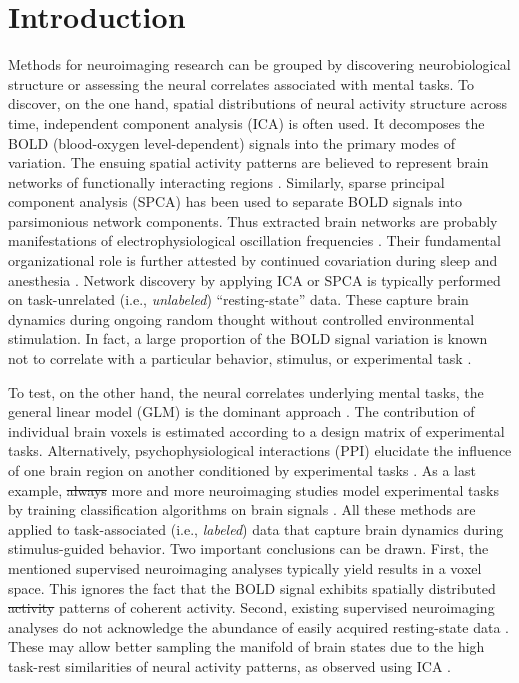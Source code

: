 \documentclass{article} %
\newcommand{\suggestadd}[1]{{\color{blue} #1}}
\newcommand{\suggestremove}[1]{{\color{red} \sout{#1}}}
\begin{document}
\section{Introduction}
%
Methods for neuroimaging research can be grouped by discovering
neurobiological structure or assessing the neural correlates associated
with mental tasks.
To discover, on the one hand, spatial distributions of neural activity
structure across time,
independent component analysis (ICA) \cite{beckmann2005} is often used.
It decomposes the BOLD (blood-oxygen level-dependent) signals into the
primary modes of variation.
The ensuing spatial activity patterns are believed to represent
brain networks of
functionally interacting regions \cite{smith2009}.
Similarly, sparse principal component analysis (SPCA) \cite{varoqu2011}
has been used to
separate BOLD signals into parsimonious network components.
Thus extracted brain networks are probably
manifestations of electrophysiological oscillation frequencies \cite{hipp15}.
Their fundamental organizational role is further
attested by continued covariation during sleep and anesthesia \cite{fox07}.
%
Network discovery by applying ICA or SPCA is typically performed on
task-unrelated (i.e., \textit{unlabeled}) ``resting-state'' data.
These capture brain dynamics
during ongoing random thought without controlled environmental stimulation.
In fact, a large proportion of the BOLD signal \suggestadd{variation} is 
known
not to correlate with a particular behavior, stimulus, or experimental task
\cite{fox07}. 

To test, on the other hand,
the neural correlates underlying mental tasks,
the general linear model (GLM) is the dominant approach \cite{friston94}.
The contribution of
individual brain voxels is estimated
according to a design matrix of experimental tasks.
Alternatively, psychophysiological interactions (PPI)
elucidate the influence of one brain region on another conditioned
by experimental tasks \cite{friston97}.
As a last example, \suggestremove{always} \suggestadd{more and} more 
neuroimaging studies model
experimental tasks by training classification algorithms on brain signals
\cite{poldrack09decoding}.
All these methods are applied to task-associated (i.e., \textit{labeled})
data that capture brain dynamics
during stimulus-guided behavior.
Two important conclusions can be drawn.
First, the mentioned supervised neuroimaging analyses typically yield
results in a voxel space.
This ignores the fact that the BOLD
signal exhibits spatially distributed \suggestremove{activity} patterns
\suggestadd{of coherent activity}.
%
Second, existing supervised neuroimaging analyses
do not acknowledge the abundance
of easily acquired resting-state data \cite{biswaldiscovery}.
These may allow better sampling the manifold of brain states
due to the high task-rest similarities of neural activity patterns,
as observed using ICA \cite{smith2009}.
\end{document}
